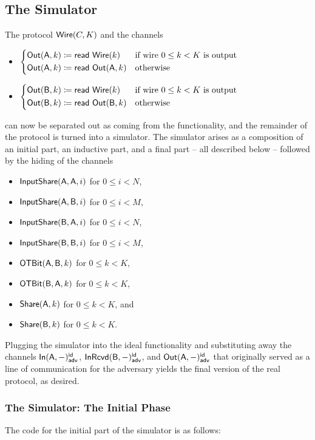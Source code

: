 \subsection{The Simulator}
The protocol $\mathsf{Wire}(C,K)$ and the channels
\begin{itemize}
\item $\begin{cases*} \Out(\A,k) \coloneqq \read{\Wire(k)} & \text{if wire $0 \leq k < K$ is output} \\ \Out(\A,k) \coloneqq \read{\Out(\A,k)} & \text{otherwise} \end{cases*}$
\item $\begin{cases*} \Out(\B,k) \coloneqq \read{\Wire(k)} & \text{if wire $0 \leq k < K$ is output} \\ \Out(\B,k) \coloneqq \read{\Out(\B,k)} & \text{otherwise} \end{cases*}$
\end{itemize}
can now be separated out as coming from the functionality, and the remainder of the protocol is turned into a simulator. The simulator arises as a composition of an initial part, an inductive part, and a final part -- all described below -- followed by the hiding of the channels \smallskip
\begin{itemize}
\item $\mathsf{InputShare}(\mathsf{A},\mathsf{A},i)$ for $0 \leq i < N$,
\item $\mathsf{InputShare}(\mathsf{A},\mathsf{B},i)$ for $0 \leq i < M$,
\item $\mathsf{InputShare}(\mathsf{B},\mathsf{A},i)$ for $0 \leq i < N$,
\item $\mathsf{InputShare}(\mathsf{B},\mathsf{B},i)$ for $0 \leq i < M$,\smallskip
\item $\mathsf{OTBit}(\mathsf{A},\mathsf{B},k)$ for $0 \leq k < K$,
\item $\mathsf{OTBit}(\mathsf{B},\mathsf{A},k)$ for $0 \leq k < K$,\smallskip
\item $\mathsf{Share}(\mathsf{A},k)$ for $0 \leq k < K$, and
\item $\mathsf{Share}(\mathsf{B},k)$ for $0 \leq k < K$.
\end{itemize}\smallskip
Plugging the simulator into the ideal functionality and substituting away the channels $\mathsf{In}(\mathsf{A},-)^{\mathsf{id}}_{\mathsf{adv}}$, $\mathsf{InRcvd}(\mathsf{B},-)^{\mathsf{id}}_{\mathsf{adv}}$, and $\mathsf{Out}(\mathsf{A},-)^{\mathsf{id}}_{\mathsf{adv}}$ that originally served as a line of communication for the adversary yields the final version of the real protocol, as desired.

\subsubsection{The Simulator: The Initial Phase}
The code for the initial part of the simulator is as follows:

